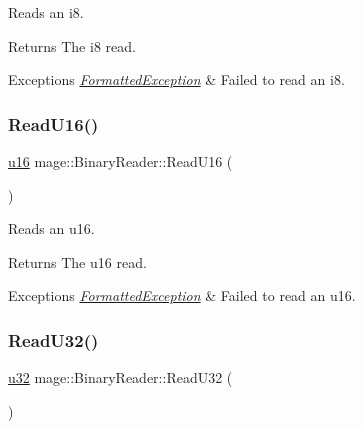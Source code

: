 Reads an {\ttfamily i8}.

\begin{DoxyReturn}{Returns}
The {\ttfamily i8} read. 
\end{DoxyReturn}

\begin{DoxyExceptions}{Exceptions}
{\em \hyperlink{structmage_1_1_formatted_exception}{Formatted\+Exception}} & Failed to read an {\ttfamily i8}. \\
\hline
\end{DoxyExceptions}
\hypertarget{classmage_1_1_binary_reader_a35c4e93b44a6864df80ceee67d6eb940}{}\label{classmage_1_1_binary_reader_a35c4e93b44a6864df80ceee67d6eb940} 
\subsubsection{\texorpdfstring{Read\+U16()}{ReadU16()}}
{\footnotesize\ttfamily \hyperlink{namespacemage_aaf695d763e29d308a85ee22c6489344e}{u16} mage\+::\+Binary\+Reader\+::\+Read\+U16 (\begin{DoxyParamCaption}{ }\end{DoxyParamCaption})\hspace{0.3cm}{\ttfamily [protected]}}

Reads an {\ttfamily u16}.

\begin{DoxyReturn}{Returns}
The {\ttfamily u16} read. 
\end{DoxyReturn}

\begin{DoxyExceptions}{Exceptions}
{\em \hyperlink{structmage_1_1_formatted_exception}{Formatted\+Exception}} & Failed to read an {\ttfamily u16}. \\
\hline
\end{DoxyExceptions}
\hypertarget{classmage_1_1_binary_reader_ac2f065778e87d58be3061469aaaa92e0}{}\label{classmage_1_1_binary_reader_ac2f065778e87d58be3061469aaaa92e0} 
\subsubsection{\texorpdfstring{Read\+U32()}{ReadU32()}}
{\footnotesize\ttfamily \hyperlink{namespacemage_af2b398bf98eb10351f49cad73fe2cc73}{u32} mage\+::\+Binary\+Reader\+::\+Read\+U32 (\begin{DoxyParamCaption}{ }\end{DoxyParamCaption})\hspace{0.3cm}{\ttfamily [protected]}}


